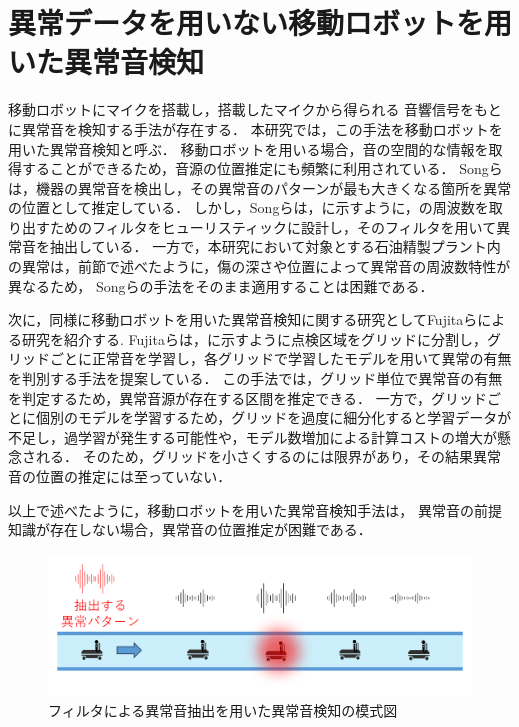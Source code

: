 \documentclass[../main]{subfiles}
\begin{document}
\section{異常データを用いない移動ロボットを用いた異常音検知}
\label{sec:related_work_mobile}

移動ロボットにマイクを搭載し，搭載したマイクから得られる
音響信号をもとに異常音を検知する手法が存在する．
本研究では，この手法を移動ロボットを用いた異常音検知と呼ぶ．
移動ロボットを用いる場合，音の空間的な情報を取得することができるため，音源の位置推定にも頻繁に利用されている．
Songらは，機器の異常音を検出し，その異常音のパターンが最も大きくなる箇所を異常の位置として推定している\cite{9023943}．
しかし，Songらは，に示すように，の周波数を取り出すためのフィルタをヒューリスティックに設計し，そのフィルタを用いて異常音を抽出している．
一方で，本研究において対象とする石油精製プラント内の異常は，前節で述べたように，傷の深さや位置によって異常音の周波数特性が異なるため，
Songらの手法をそのまま適用することは困難である．

次に，同様に移動ロボットを用いた異常音検知に関する研究としてFujitaらによる研究を紹介する\cite{10202270}.
Fujitaらは，に示すように点検区域をグリッドに分割し，グリッドごとに正常音を学習し，各グリッドで学習したモデルを用いて異常の有無を判別する手法を提案している．
この手法では，グリッド単位で異常音の有無を判定するため，異常音源が存在する区間を推定できる．
一方で，グリッドごとに個別のモデルを学習するため，グリッドを過度に細分化すると学習データが不足し，過学習が発生する可能性や，モデル数増加による計算コストの増大が懸念される．
そのため，グリッドを小さくするのには限界があり，その結果異常音の位置の推定には至っていない．


以上で述べたように，移動ロボットを用いた異常音検知手法は，
異常音の前提知識が存在しない場合，異常音の位置推定が困難である．

\begin{figure}[t]
  \centering
  \includegraphics[keepaspectratio, width=1.0\linewidth]{chap2/supervised_prev_research.png}
  \caption{フィルタによる異常音抽出を用いた異常音検知の模式図}
  \label{fig:supervised_prev_research}
\end{figure}
\end{document}
